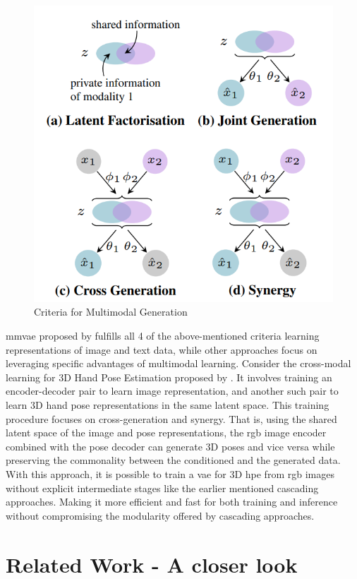 \begin{figure}[!h]

    \centering

    \includegraphics[scale=0.4]{figures/criteria.png}

    \caption{Criteria for Multimodal Generation \cite{MMVAE}}

    \label{fig:criteria}

\end{figure}



\ac{mmvae} proposed by \cite{MMVAE} fulfills all 4 of the above-mentioned 
criteria learning representations of image and text data, while other 
approaches focus on leveraging specific advantages of multimodal learning. 
Consider the cross-modal learning for 3D Hand Pose Estimation proposed by 
\cite{crossmodal}. It involves training an encoder-decoder pair to learn 
image representation, and another such pair to learn 3D hand pose 
representations in the same latent space. This training procedure focuses 
on cross-generation and synergy. That is, using the shared latent space of 
the image and pose representations, the \ac{rgb} image encoder combined 
with the pose decoder can generate 3D poses and vice versa while preserving 
the commonality between the conditioned and the generated data. With this 
approach, it is possible to train a \ac{vae} for 3D \ac{hpe} from \ac{rgb} 
images without explicit intermediate stages like the earlier mentioned 
cascading approaches. Making it more efficient and fast for both training 
and inference without compromising the modularity offered by cascading 
approaches.




\section{Related Work - A closer look}

\label{section:Related Work}

\lipsum[1-5] %
